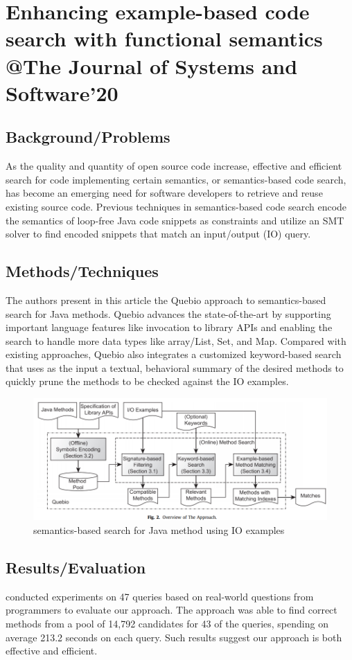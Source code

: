 \section{Enhancing example-based code search with functional semantics @The Journal of Systems and Software'20}
\subsection{Background/Problems}
As the quality and quantity of open source code increase, effective and efficient search for code implementing certain semantics, or semantics-based code search, has become an emerging need for software developers to retrieve and reuse existing source code. Previous techniques in semantics-based code search encode the semantics of loop-free Java code snippets as constraints and utilize an SMT solver to find encoded snippets that match an input/output (IO) query.
\subsection{Methods/Techniques}
The authors present in this article the Quebio approach to semantics-based search for Java methods. Quebio advances the state-of-the-art by supporting important language features like invocation to library APIs and enabling the search to handle more data types like array/List, Set, and Map. Compared with existing approaches, Quebio also integrates a customized keyword-based search that uses as the input a textual, behavioral summary of the desired methods to quickly prune the methods to be checked against the IO examples.
\begin{figure}[h]
    \centering
    \includegraphics[width=.9\linewidth]{codesearch_semantic_based.png} %
    \caption{semantics-based search for Java method using IO examples}	
    \label{fig:codesearch_semantic_based}
\end{figure}
\subsection{Results/Evaluation}
conducted experiments on 47 queries based on real-world questions from programmers to evaluate our approach. The approach was able to find correct methods from a pool of 14,792 candidates for 43 of the queries, spending on average 213.2 seconds on each query. Such results suggest our approach is both effective and efficient.

